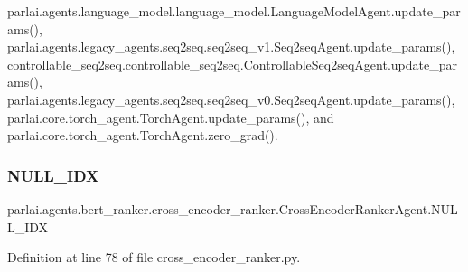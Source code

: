 parlai.\+agents.\+language\+\_\+model.\+language\+\_\+model.\+Language\+Model\+Agent.\+update\+\_\+params(), parlai.\+agents.\+legacy\+\_\+agents.\+seq2seq.\+seq2seq\+\_\+v1.\+Seq2seq\+Agent.\+update\+\_\+params(), controllable\+\_\+seq2seq.\+controllable\+\_\+seq2seq.\+Controllable\+Seq2seq\+Agent.\+update\+\_\+params(), parlai.\+agents.\+legacy\+\_\+agents.\+seq2seq.\+seq2seq\+\_\+v0.\+Seq2seq\+Agent.\+update\+\_\+params(), parlai.\+core.\+torch\+\_\+agent.\+Torch\+Agent.\+update\+\_\+params(), and parlai.\+core.\+torch\+\_\+agent.\+Torch\+Agent.\+zero\+\_\+grad().

\mbox{\label{classparlai_1_1agents_1_1bert__ranker_1_1cross__encoder__ranker_1_1CrossEncoderRankerAgent_afa32c6bdd2b271f3f3d0b823e65397c2}} 
\subsubsection{\texorpdfstring{N\+U\+L\+L\+\_\+\+I\+DX}{NULL\_IDX}}
{\footnotesize\ttfamily parlai.\+agents.\+bert\+\_\+ranker.\+cross\+\_\+encoder\+\_\+ranker.\+Cross\+Encoder\+Ranker\+Agent.\+N\+U\+L\+L\+\_\+\+I\+DX}



Definition at line 78 of file cross\+\_\+encoder\+\_\+ranker.\+py.



